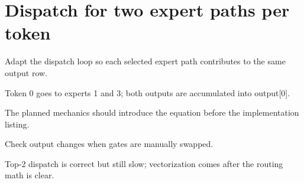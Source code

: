 \section{Dispatch for two expert paths per token}
\label{sec:ch05-dispatch-for-two-expert-paths-per-token}

Adapt the dispatch loop so each selected expert path contributes to the same output row.



Token 0 goes to experts 1 and 3; both outputs are accumulated into output[0].



The planned mechanics should introduce the equation before the implementation listing.





\begin{checkpointbox}
Check output changes when gates are manually swapped.
\end{checkpointbox}

Top-2 dispatch is correct but still slow; vectorization comes after the routing math is clear.
